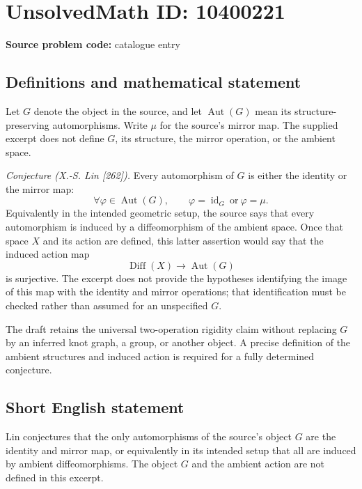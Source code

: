 \documentclass[11pt]{article}
\begin{document}
\section*{UnsolvedMath ID: 10400221}
\textbf{Source problem code:} catalogue entry
\subsection{Definitions and mathematical statement}
Let \(G\) denote the object in the source, and let \(\operatorname{Aut}(G)\) mean its structure-preserving automorphisms. Write \(\mu\) for the source's mirror map. The supplied excerpt does not define \(G\), its structure, the mirror operation, or the ambient space.

\emph{Conjecture (X.-S. Lin [262]).} Every automorphism of \(G\) is either the identity or the mirror map:
\[
 \forall\varphi\in\operatorname{Aut}(G),\qquad
 \varphi=\operatorname{id}_G\ \text{or}\ \varphi=\mu.
\]
Equivalently in the intended geometric setup, the source says that every automorphism is induced by a diffeomorphism of the ambient space. Once that space \(X\) and its action are defined, this latter assertion would say that the induced action map
\[
 \operatorname{Diff}(X)\longrightarrow\operatorname{Aut}(G)
\]
is surjective. The excerpt does not provide the hypotheses identifying the image of this map with the identity and mirror operations; that identification must be checked rather than assumed for an unspecified \(G\).

The draft retains the universal two-operation rigidity claim without replacing \(G\) by an inferred knot graph, a group, or another object. A precise definition of the ambient structures and induced action is required for a fully determined conjecture.
\subsection{Short English statement}
Lin conjectures that the only automorphisms of the source's object \(G\) are the identity and mirror map, or equivalently in its intended setup that all are induced by ambient diffeomorphisms. The object \(G\) and the ambient action are not defined in this excerpt.
\end{document}

